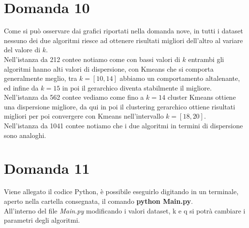 \documentclass{article}
\begin{document}
\section*{Domanda 10}
Come si può osservare dai grafici riportati nella domanda nove, in tutti i dataset nessuno dei due algoritmi riesce ad ottenere risultati migliori dell'altro al variare del valore di $k$.\\
Nell'istanza da 212 contee notiamo come con bassi valori di $k$ entrambi gli algoritmi hanno alti valori di dispersione, con Kmeans che si comporta generalmente meglio, tra $k=[10,14]$ abbiamo un comportamento altalenante, ed infine da $k=15$ in poi il gerarchico diventa stabilmente il migliore.\\
Nell'istanza da 562 contee vediamo come fino a $k=14$ cluster Kmeans ottiene una dispersione migliore, da qui in poi il clustering gerarchico ottiene risultati migliori per poi convergere con Kmeans nell'intervallo $k=[18,20]$.\\
Nell'istanza da 1041 contee notiamo che i due algoritmi in termini di dispersione sono analoghi.

\section*{Domanda 11}
Viene allegato il codice Python, è possibile eseguirlo digitando in un terminale, aperto nella cartella consegnata, il comando \textbf{python Main.py}.\\ All'interno del file \textit{Main.py} modificando i valori dataset, k e q si potrà cambiare i parametri degli algoritmi.
\end{document}
